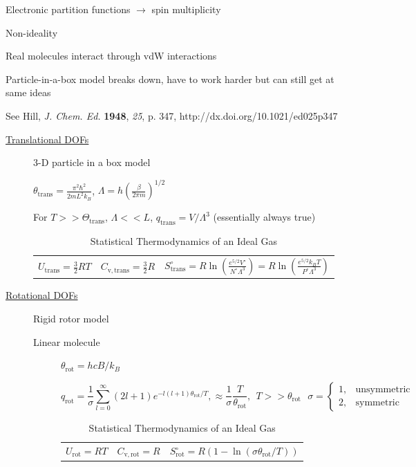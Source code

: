 \message{ !name(Outline.tex)}\documentclass[11pt]{article}
\begin{document}
\begin{outline}
\begin{outline}
      \item Electronic partition functions $\rightarrow$ spin multiplicity
      \item Non-ideality
        \begin{outline}
          \item Real molecules interact through vdW interactions
          \item Particle-in-a-box model breaks down, have to work harder but
            can still get at same ideas
          \item See Hill, {\em J. Chem. Ed.} {\bf 1948}, {\em 25}, p. 347, http://dx.doi.org/10.1021/ed025p347
        \end{outline}
      \end{outline}

\begin{table} 
\begin{center}
    \caption{\large{Statistical Thermodynamics of an Ideal Gas}}
   \begin{description}
    \item[\underline{Translational DOFs}] {3-D particle in a box model}

$\displaystyle \theta_\mathrm{trans}= \frac{\pi^2\hbar^2}{2 m
  L^2 k_B}$, 
$\displaystyle \Lambda=h\left( \frac{\beta}{2\pi m}\right )^{1/2}$

For $ T >> \Theta_\mathrm{trans}$, $\Lambda << L$, $\displaystyle
q_\mathrm{trans}=V/\Lambda^3$ (essentially always true)

\begin{tabular}{ccc}
$\displaystyle U_\mathrm{trans}=\frac{3}{2}RT$ & $\displaystyle C_\mathrm{v,trans} =
\frac{3}{2}R $ & $\displaystyle S^\circ_\mathrm{trans}=R \ln \left (
  \frac{e^{5/2}V^\circ}{N^\circ \Lambda^3}\right ) = R \ln \left (
  \frac{e^{5/2}k_BT}{P^\circ \Lambda^3}\right ) $ \\
\end{tabular}

  \item[\underline{Rotational DOFs}] {Rigid rotor model}
\begin{description}
\item[Linear molecule]{}
$\theta_\mathrm{rot} =hcB/k_B$

\begin{equation*}
q_\mathrm{rot}=\frac{1}{\sigma}\sum_{l=0}^\infty (2l+1)e^{-l(l+1)\theta_\mathrm{rot}/T},  
\approx \frac{1}{\sigma}\frac{T}{\theta_\mathrm{rot}},\ \ T>>\theta_\mathrm{rot}\ \ \ \sigma = \left \{
        \begin{array}{rl}
          1, & \text{unsymmetric} \\
          2, & \text{symmetric}
        \end{array} \right . 
\end{equation*}
\begin{tabular}{ccc}
$\displaystyle U_\mathrm{rot}=RT$ & $\displaystyle C_\mathrm{v,rot} =
R $ & $\displaystyle S^\circ_\mathrm{rot}=R (1-\ln(\sigma\theta_\mathrm{rot}/T)) $ \\
\end{tabular}


\end{description}
\end{description}
\end{center}
\end{table}
\end{outline}
\end{document}
